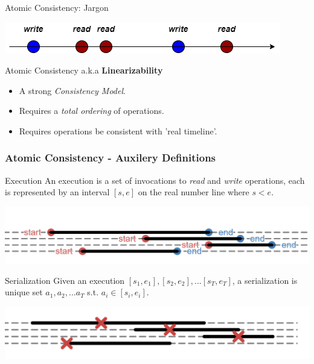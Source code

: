 \begin{frame}{Atomic Consistency: Jargon}
    \begin{center}
        \includegraphics[scale=.5]{resources/memory_model_naive.png}
    \end{center}
    \begin{block}{Atomic Consistency a.k.a \textbf{Linearizability}}
        \begin{itemize}
            \item A strong \emph{Consistency Model}.
            \item Requires a \emph{total ordering} of operations.
            \item Requires operations be consistent with 'real timeline'.
        \end{itemize}
    \end{block}
\end{frame}
\begin{frame}
    \frametitle{Atomic Consistency - Auxilery Definitions}
    \begin{block}{Execution}
        An execution is a set of invocations to \emph{read} and \emph{write} operations,
        each is represented by an interval $[s,e]$ on
        the real number line where $s<e$.
    \end{block}
    \begin{center}
        \includegraphics[scale=.5]{resources/execution_start_end.png}
    \end{center}
    \pause
    \begin{alertblock}{Serialization}
        Given an execution $[s_1, e_1], [s_2, e_2], ... [s_T, e_T]$,
        a serialization is unique set $a_1,a_2,...a_T$ s.t. $a_i\in[s_i,e_i]$.
    \end{alertblock}
    \begin{center}
        \includegraphics[scale=.5]{resources/execution_serialization.png}
    \end{center}
\end{frame}
